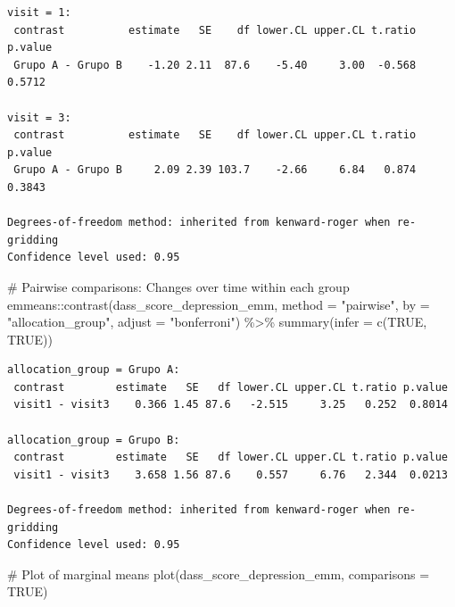 \documentclass[
  letterpaper,
  DIV=11,
  numbers=noendperiod]{scrartcl}
\newenvironment{Shaded}{\begin{snugshade}}{\end{snugshade}}
\newcommand{\AttributeTok}[1]{\textcolor[rgb]{0.40,0.45,0.13}{#1}}
\newcommand{\CommentTok}[1]{\textcolor[rgb]{0.37,0.37,0.37}{#1}}
\newcommand{\ConstantTok}[1]{\textcolor[rgb]{0.56,0.35,0.01}{#1}}
\newcommand{\FunctionTok}[1]{\textcolor[rgb]{0.28,0.35,0.67}{#1}}
\newcommand{\NormalTok}[1]{\textcolor[rgb]{0.00,0.23,0.31}{#1}}
\newcommand{\SpecialCharTok}[1]{\textcolor[rgb]{0.37,0.37,0.37}{#1}}
\newcommand{\StringTok}[1]{\textcolor[rgb]{0.13,0.47,0.30}{#1}}
\begin{document}
\begin{verbatim}
visit = 1:
 contrast          estimate   SE    df lower.CL upper.CL t.ratio p.value
 Grupo A - Grupo B    -1.20 2.11  87.6    -5.40     3.00  -0.568  0.5712

visit = 3:
 contrast          estimate   SE    df lower.CL upper.CL t.ratio p.value
 Grupo A - Grupo B     2.09 2.39 103.7    -2.66     6.84   0.874  0.3843

Degrees-of-freedom method: inherited from kenward-roger when re-gridding 
Confidence level used: 0.95 
\end{verbatim}

\begin{Shaded}
\begin{Highlighting}[]
\CommentTok{\# Pairwise comparisons: Changes over time within each group}
\NormalTok{emmeans}\SpecialCharTok{::}\FunctionTok{contrast}\NormalTok{(dass\_score\_depression\_emm, }\AttributeTok{method =} \StringTok{"pairwise"}\NormalTok{, }\AttributeTok{by =} \StringTok{"allocation\_group"}\NormalTok{, }\AttributeTok{adjust =} \StringTok{"bonferroni"}\NormalTok{) }\SpecialCharTok{\%\textgreater{}\%} \FunctionTok{summary}\NormalTok{(}\AttributeTok{infer =} \FunctionTok{c}\NormalTok{(}\ConstantTok{TRUE}\NormalTok{, }\ConstantTok{TRUE}\NormalTok{))}
\end{Highlighting}
\end{Shaded}

\begin{verbatim}
allocation_group = Grupo A:
 contrast        estimate   SE   df lower.CL upper.CL t.ratio p.value
 visit1 - visit3    0.366 1.45 87.6   -2.515     3.25   0.252  0.8014

allocation_group = Grupo B:
 contrast        estimate   SE   df lower.CL upper.CL t.ratio p.value
 visit1 - visit3    3.658 1.56 87.6    0.557     6.76   2.344  0.0213

Degrees-of-freedom method: inherited from kenward-roger when re-gridding 
Confidence level used: 0.95 
\end{verbatim}

\begin{Shaded}
\begin{Highlighting}[]
\CommentTok{\# Plot of marginal means}
\FunctionTok{plot}\NormalTok{(dass\_score\_depression\_emm, }\AttributeTok{comparisons =} \ConstantTok{TRUE}\NormalTok{)}
\end{Highlighting}
\end{Shaded}
\end{document}
